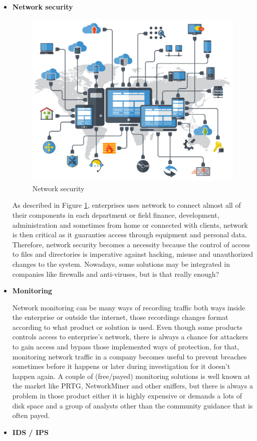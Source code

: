 \begin{itemize}[label=]

\item\textbf{Network security }

\begin{figure}[!htpb] 
\begin{center}
\includegraphics[height=3.6 in]{images/ATHENAnetsec.jpg}
\end{center}
\caption{ Network security }
\label{netsec}
\end{figure} 
As described in Figure \ref{netsec}, enterprises uses network to connect almost all of their components in each department or field finance, development, administration and sometimes from home or connected with clients, network is then critical as it guaranties access through equipment and personal data. Therefore, network security becomes a necessity because the control of access to files and directories is imperative against hacking, misuse and unauthorized changes to the system. Nowadays, some solutions may be integrated in companies like firewalls and anti-viruses, but is that really enough?  

\item\textbf{Monitoring}

Network monitoring can be many ways of recording traffic both ways inside the enterprise or outside the internet, those recordings changes format according to what product or solution is used. 
Even though some products controls access to enterprise's network, there is always a chance for attackers to gain access and bypass those implemented ways of protection, for that, monitoring network traffic in a company becomes useful to prevent breaches sometimes before it happens or later during investigation for it doesn't happen again. A couple of (free/payed) monitoring solutions is well known at the market like PRTG, NetworkMiner and other sniffers, but there is always a problem in those product either it is highly expensive or demands a lots of disk space and a group of analysts other than the community guidance that is often payed. 
\item\textbf{ IDS / IPS }


\end{itemize}
